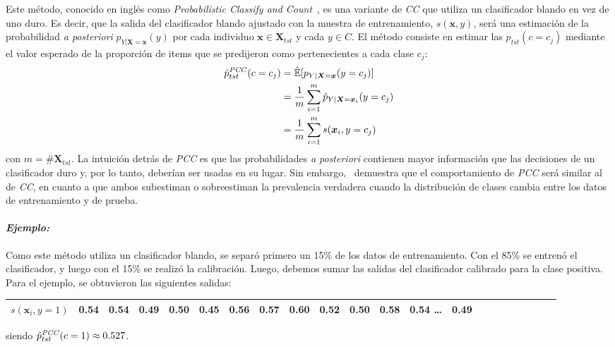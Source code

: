Este método, conocido en inglés como {\it Probabilistic Classify and
Count\/}~\cite{bella2010quantification, tang2010network}, es una variante de
{\it CC\/} que utiliza un clasificador blando en vez de uno duro. Es decir, que
la salida del clasificador blando ajustado con la muestra de entrenamiento,
\(s(\boldsymbol{x}, y)\), será una estimación de la probabilidad {\it a
posteriori\/} \({p}_{Y|\boldsymbol{X}=\boldsymbol{x}}(y)\) por cada individuo
\(\boldsymbol{x} \in \boldsymbol{X}_{tst}\) y cada \(y \in C\). El método
consiste en estimar las \({p}_{tst}(c=c_j)\) mediante el valor esperado de la
proporción de items que se predijeron como pertenecientes a cada clase \(c_j\):
\begin{align}
\begin{split}
    \hat p^{\it PCC\/}_{tst}(c=c_j) &= \mathbb{\hat E}[p_{Y|\boldsymbol{X}=\boldsymbol{x}}(y=c_j)] \\
    &= \frac{1}{m} \sum \limits_{i=1}^{m}{\hat p_{Y|\boldsymbol{X}=\boldsymbol{x}_i}(y=c_j)} \\
    &= \frac{1}{m} \sum \limits_{i=1}^{m}{s(\boldsymbol{x}_i, y=c_j)}
\end{split}
\end{align}
con \(m=\#\boldsymbol{X}_{tst}\). La intuición detrás de {\it PCC\/} es que las
probabilidades {\it a posteriori\/} contienen mayor información que las
decisiones de un clasificador duro y, por lo tanto, deberían ser usadas en su
lugar. Sin embargo,~\citet[Corolario 6, p.157 y p.163]{tasche2014exact}
demuestra que el comportamiento de {\it PCC\/} será similar al de {\it CC}, en
cuanto a que ambos subestiman o sobreestiman la prevalencia verdadera cuando la
distribución de clases cambia entre los datos de entrenamiento y de prueba.

\paragraph{\it Ejemplo:\/} Como este método utiliza un clasificador blando, se
separó primero un 15\% de los datos de entrenamiento. Con el 85\% se entrenó el
clasificador, y luego con el 15\% se realizó la calibración. Luego, debemos
sumar las salidas del clasificador calibrado para la clase positiva. Para el
ejemplo, se obtuvieron las siguientes salidas:
\begin{center}
    \begin{tabular}{lrrrrrrrrrrrrrrrrrrrrr}
        \toprule
        \textbf{$s(\boldsymbol{x}_i, y=1)$} & 0.54 & 0.54 & 0.49 & 0.50 & 0.45 &
        0.56 & 0.57 & 0.60 & 0.52 & 0.50 & 0.58 & 0.54 \ldots & 0.49 \\
        \bottomrule
    \end{tabular}
\end{center}
siendo \(\hat p^{\it PCC\/}_{tst}(c=1) \approx 0.527\).

